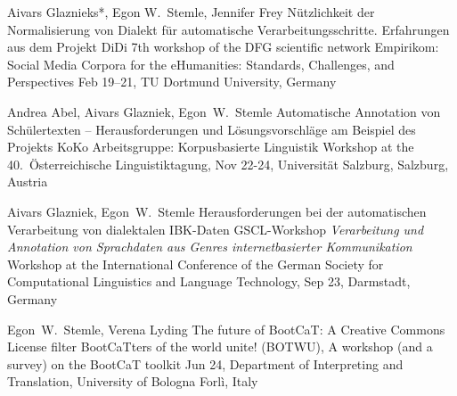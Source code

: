 \documentclass[10pt,a4paper,sans]{moderncv}
\begin{document}
        {Aivars Glaznieks*, Egon W.~Stemle, Jennifer Frey}
        {Nützlichkeit der Normalisierung von Dialekt für automatische
         Verarbeitungsschritte. Erfahrungen aus dem Projekt DiDi}
        {7th workshop of the DFG scientific network Empirikom: Social
        Media Corpora for the eHumanities: Standards, Challenges, and
        Perspectives}
        {Feb 19–21, TU Dortmund University, Germany}
        {}

        {Andrea Abel, Aivars Glazniek, Egon~W.~Stemle}
        {Automatische Annotation von Schülertexten -- Herausforderungen
        und Lösungsvorschläge am Beispiel des Projekts KoKo}
        {Arbeitsgruppe: Korpusbasierte Linguistik} 
        {Workshop at the 40.~Österreichische Linguistiktagung, Nov
        22-24, Universität Salzburg, Salzburg, Austria}
        {}


        {Aivars Glazniek, Egon~W.~Stemle}
        {Herausforderungen bei der automatischen Verarbeitung von dialektalen IBK-Daten}
        {GSCL-Workshop \emph{Verarbeitung und Annotation von Sprachdaten aus
        Genres internetbasierter Kommunikation}}
        {Workshop at the International Conference of the German Society
        for Computational Linguistics and Language Technology, Sep 23,
        Darmstadt, Germany}
        {}

        {Egon~W.~Stemle, Verena Lyding}
        {The future of BootCaT: A Creative Commons License filter}
        {BootCaTters of the world unite! (BOTWU), A workshop (and a
        survey) on the BootCaT toolkit}
        {Jun 24, Department of Interpreting and Translation, University
        of Bologna Forl\`{i}, Italy}
        {}

\end{document}
